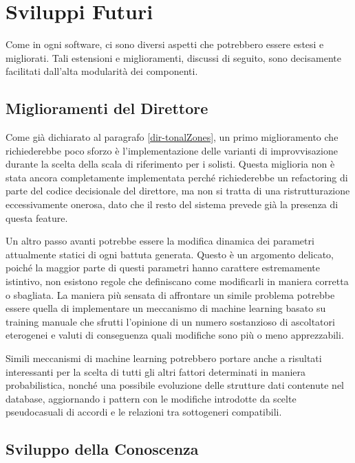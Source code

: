 \section{Sviluppi Futuri}
Come in ogni software, ci sono diversi aspetti che
potrebbero essere estesi e migliorati. Tali estensioni e miglioramenti,
discussi di seguito, sono decisamente facilitati dall'alta modularità
dei componenti.
\subsection{Miglioramenti del Direttore}
Come già dichiarato al paragrafo \ref{dir-tonalZones}, un primo miglioramento che richiederebbe poco sforzo è l'implementazione delle varianti di improvvisazione durante la scelta della scala di riferimento per i solisti. Questa miglioria non è stata ancora completamente implementata perché richiederebbe un refactoring di parte del codice decisionale del direttore, ma non si tratta di una ristrutturazione eccessivamente onerosa, dato che il resto del sistema prevede già la presenza di questa feature.

Un altro passo avanti potrebbe essere la modifica dinamica dei parametri attualmente statici di ogni battuta generata. Questo è un argomento delicato, poiché la maggior parte di questi parametri hanno carattere estremamente istintivo, non esistono regole che definiscano come modificarli in maniera corretta o sbagliata.
La maniera più sensata di affrontare un simile problema potrebbe essere quella di implementare un meccanismo di machine learning basato su training manuale che sfrutti l'opinione di un numero sostanzioso di ascoltatori eterogenei e valuti di conseguenza quali modifiche sono più o meno apprezzabili.

Simili meccanismi di machine learning potrebbero portare anche a risultati interessanti per la scelta di tutti gli altri fattori determinati in maniera probabilistica, nonché una possibile evoluzione delle strutture dati contenute nel database, aggiornando i pattern con le modifiche introdotte da scelte pseudocasuali di accordi e le relazioni tra sottogeneri compatibili.

\subsection{Sviluppo della Conoscenza}

